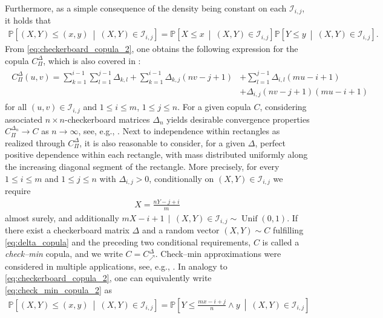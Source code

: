 \documentclass{article}
\theoremstyle{definition}
\newcommand{\II}{\mathcal{I}}  %
\newcommand{\Prob}{\mathbb{P}}  %
\DeclareMathOperator{\Unif}{Unif}  %
\begin{document}
Furthermore, as a simple consequence of the density being constant on each $\II_{i,j}$, it holds that
\begin{align}\label{eq:checkerboard_copula_2}
    \Prob\left[(X,Y)\leq (x,y)~\middle|~(X,Y)\in\II_{i,j}\right]
    = \Prob\left[X\leq x~\middle|~(X,Y)\in\II_{i,j}\right] \Prob\left[Y\leq y~\middle|~(X,Y)\in\II_{i,j}\right]
.\end{align}
From \eqref{eq:checkerboard_copula_2}, one obtains the following expression for the copula $C^{\Delta}_{\Pi}$, which is also covered in \cite[Theorem 4.1.3]{Durante-2016}:
\begin{align}\label{frm:check_pi}
    \begin{aligned}
    C^{\Delta}_{\Pi}(u,v)
    = \sum_{k=1}^{i-1}\sum_{l=1}^{j-1} \Delta_{k,l}
      + \sum_{k=1}^{i-1}\Delta_{k,j} (nv-j+1)
    & + \sum_{l=1}^{j-1}\Delta_{i,l}(mu-i+1) \\
    & + \Delta_{i,j} (nv-j+1)(mu-i+1)
    \end{aligned}
\end{align}
for all $(u,v)\in \II_{i,j}$ and $1\leq i \leq m$, $1\leq j \leq n$.
For a given copula $C$, considering associated $n\times n$-checkerboard matrices $\Delta_n$ yields desirable convergence properties $C^{\Delta_n}_{\Pi}\rightarrow C$ as $n\to\infty$, see, e.g., \cite[Corollary 3.2]{li1998strong}.
Next to independence within rectangles as realized through $C^{\Delta}_{\Pi}$, it is also reasonable to consider, for a given $\Delta$, perfect positive dependence within each rectangle, with mass distributed uniformly along the increasing diagonal segment of the rectangle.
More precisely, for every $1\le i\le m$ and $1\le j\le n$ with $\Delta_{i,j}>0$, conditionally on $(X,Y)\in\II_{i,j}$ we require
\begin{align}\label{eq:check_min_copula_2}
    X = \frac{nY - j + i}{m}
\end{align}
almost surely, and additionally
\(
    mX-i+1 \,\mid\, (X,Y)\in\II_{i,j} \sim \Unif(0,1).
\)
If there exist a checkerboard matrix $\Delta$ and a random vector $(X,Y)\sim C$ fulfilling \eqref{eq:delta_copula} and the preceding two conditional requirements, $C$ is called a \emph{check--min} copula, and we write \(C=C^{\Delta}_{\nearrow}\).
Check--min approximations were considered in multiple applications, see, e.g., \cite{Mikusinski-2010,zheng2011approximation,durante2015typical}.
In analogy to \eqref{eq:checkerboard_copula_2}, one can equivalently write \eqref{eq:check_min_copula_2} as
\begin{align}\label{eq:check_min_copula}
    \Prob\left[(X,Y)\leq (x,y)~\middle|~(X,Y) \in \II_{i,j}\right]
    = \Prob\left[ Y \leq \frac{mx - i + j}{n} \wedge y ~\middle|~(X,Y) \in \II_{i,j}\right]
\end{align}
\end{document}
